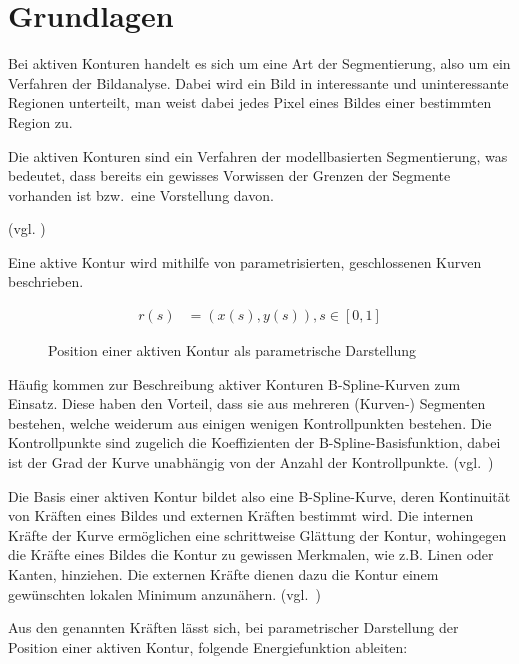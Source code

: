 \chapter{Grundlagen}
\label{chap:basics}


Bei aktiven Konturen handelt es sich um eine Art der Segmentierung, also um ein Verfahren der Bildanalyse. Dabei wird ein Bild in interessante und uninteressante Regionen unterteilt, man weist dabei jedes Pixel eines Bildes einer bestimmten Region zu. 

Die aktiven Konturen sind ein Verfahren der modellbasierten Segmentierung, was bedeutet, dass bereits ein gewisses Vorwissen der Grenzen der Segmente vorhanden ist bzw.\ eine Vorstellung davon.

(vgl. \citeauthor*[S. 133 und 144]{hudritsch:script:cp}) %

Eine aktive Kontur wird mithilfe von parametrisierten, geschlossenen Kurven beschrieben.

\begin{figure}[H]
    \begin{align}
        r(s) & = (x(s), y(s)), s \in [0,1]
    \end{align}
    \caption{Position einer aktiven Kontur als parametrische Darstellung~\cite{kass88snakes:active}}
\end{figure}

Häufig kommen zur Beschreibung aktiver Konturen B-Spline-Kurven zum Einsatz. Diese haben den Vorteil, dass sie aus mehreren (Kurven-) Segmenten bestehen, welche weiderum aus einigen wenigen Kontrollpunkten bestehen. Die Kontrollpunkte sind zugelich die Koeffizienten der B-Spline-Basisfunktion, dabei ist der Grad der Kurve unabhängig von der Anzahl der Kontrollpunkte. (vgl.~\citeauthor*[S. 79]{fuhrer:script:splines}) %

Die Basis einer aktiven Kontur bildet also eine B-Spline-Kurve, deren Kontinuität von Kräften eines Bildes und externen Kräften bestimmt wird. Die internen Kräfte der Kurve ermöglichen eine schrittweise Glättung der Kontur, wohingegen die Kräfte eines Bildes die Kontur zu gewissen Merkmalen, wie z.B. Linen oder Kanten, hinziehen. Die externen Kräfte dienen dazu die Kontur einem gewünschten lokalen Minimum anzunähern. (vgl.~\citeauthor*[S. 323]{kass88snakes:active}) %

Aus den genannten Kräften lässt sich, bei parametrischer Darstellung der Position einer aktiven Kontur, folgende Energiefunktion ableiten:

